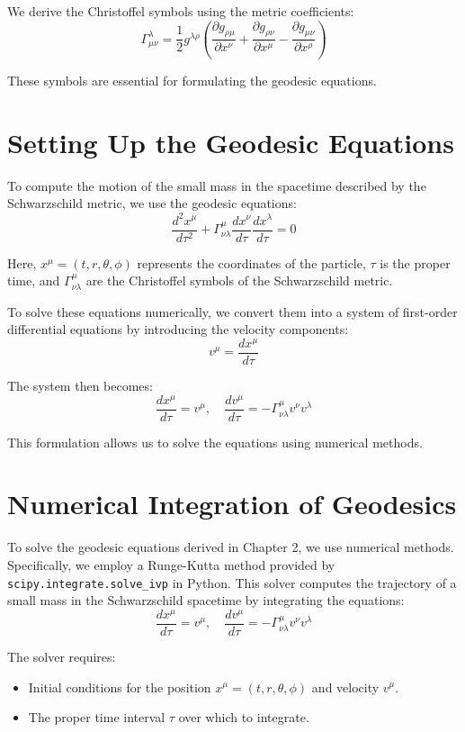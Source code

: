 \documentclass[12pt]{article}
\begin{document}
We derive the Christoffel symbols using the metric coefficients:
\[
\Gamma^\lambda_{\mu\nu} = \frac{1}{2} g^{\lambda\rho} \left( \frac{\partial g_{\rho\mu}}{\partial x^\nu} + \frac{\partial g_{\rho\nu}}{\partial x^\mu} - \frac{\partial g_{\mu\nu}}{\partial x^\rho} \right)
\]

These symbols are essential for formulating the geodesic equations.

\newpage

\section{Setting Up the Geodesic Equations}

To compute the motion of the small mass in the spacetime described by the Schwarzschild metric, we use the geodesic equations:
\[
\frac{d^2 x^\mu}{d\tau^2} + \Gamma^\mu_{\nu\lambda} \frac{dx^\nu}{d\tau} \frac{dx^\lambda}{d\tau} = 0
\]

Here, \(x^\mu = (t, r, \theta, \phi)\) represents the coordinates of the particle, \(\tau\) is the proper time, and \(\Gamma^\mu_{\nu\lambda}\) are the Christoffel symbols of the Schwarzschild metric.

To solve these equations numerically, we convert them into a system of first-order differential equations by introducing the velocity components:
\[
v^\mu = \frac{dx^\mu}{d\tau}
\]

The system then becomes:
\[
\frac{dx^\mu}{d\tau} = v^\mu, \quad \frac{dv^\mu}{d\tau} = -\Gamma^\mu_{\nu\lambda} v^\nu v^\lambda
\]

This formulation allows us to solve the equations using numerical methods.

\newpage

\section{Numerical Integration of Geodesics}

To solve the geodesic equations derived in Chapter 2, we use numerical methods. Specifically, we employ a Runge-Kutta method provided by \texttt{scipy.integrate.solve\_ivp} in Python. This solver computes the trajectory of a small mass in the Schwarzschild spacetime by integrating the equations:
\[
\frac{dx^\mu}{d\tau} = v^\mu, \quad \frac{dv^\mu}{d\tau} = -\Gamma^\mu_{\nu\lambda} v^\nu v^\lambda
\]

The solver requires:
\begin{itemize}
    \item Initial conditions for the position \(x^\mu = (t, r, \theta, \phi)\) and velocity \(v^\mu\).
    \item The proper time interval \(\tau\) over which to integrate.
\end{itemize}
\end{document}
